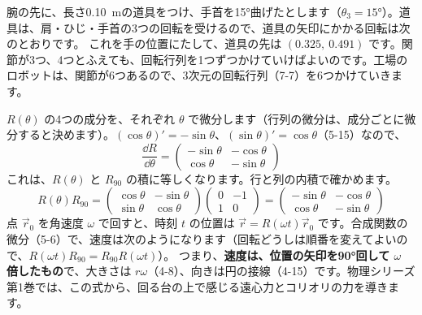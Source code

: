 腕の先に、長さ\qty{0.10}{m}の道具をつけ、手首を15°曲げたとします（$\theta_3=15°$）。道具は、肩・ひじ・手首の3つの回転を受けるので、道具の矢印にかかる回転は次のとおりです。
これを手の位置にたして、道具の先は $(0.325,\ 0.491)$ です。関節が3つ、4つとふえても、回転行列を1つずつかけていけばよいのです。工場のロボットは、関節が6つあるので、3次元の回転行列（7-7）を6つかけていきます。



\par\noindent\begin{minipage}{\linewidth}
\begin{motto}[5]
$R(\theta)$ の4つの成分を、それぞれ $\theta$ で微分します（行列の微分は、成分ごとに微分すると決めます）。$(\cos\theta)'=-\sin\theta$、$(\sin\theta)'=\cos\theta$（5-15）なので、
\[\frac{\dd R}{\dd\theta}=\begin{pmatrix}-\sin\theta&-\cos\theta\\\cos\theta&-\sin\theta\end{pmatrix}\]
これは、$R(\theta)$ と $R_{90}$ の積に等しくなります。行と列の内積で確かめます。
\[R(\theta)R_{90}=\begin{pmatrix}\cos\theta&-\sin\theta\\\sin\theta&\cos\theta\end{pmatrix}\begin{pmatrix}0&-1\\1&0\end{pmatrix}=\begin{pmatrix}-\sin\theta&-\cos\theta\\\cos\theta&-\sin\theta\end{pmatrix}\]
点 $\vec r_0$ を角速度 $\omega$ で回すと、時刻 $t$ の位置は $\vec r=R(\omega t)\vec r_0$ です。合成関数の微分（5-6）で、速度は次のようになります（回転どうしは順番を変えてよいので、$R(\omega t)R_{90}=R_{90}R(\omega t)$）。
つまり、\textbf{速度は、位置の矢印を90°回して $\omega$ 倍したもの}で、大きさは $r\omega$（4-8）、向きは円の接線（4-15）です。物理シリーズ第1巻では、この式から、回る台の上で感じる遠心力とコリオリの力を導きます。
\end{motto}
\end{minipage}\par

